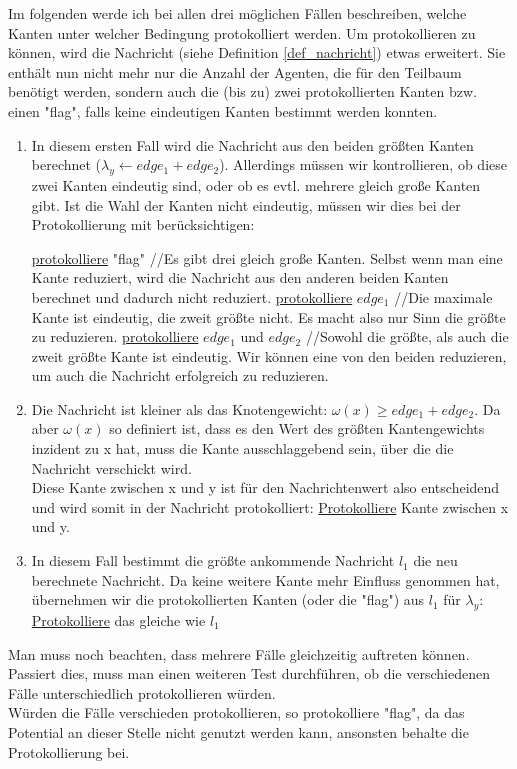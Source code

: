 Im folgenden werde ich bei allen drei möglichen Fällen beschreiben, welche Kanten unter welcher Bedingung protokolliert werden. Um protokollieren zu können, wird die Nachricht (siehe Definition \ref{def_nachricht}) etwas erweitert. Sie enthält nun nicht mehr nur die Anzahl der Agenten, die für den Teilbaum benötigt werden, sondern auch die (bis zu) zwei protokollierten Kanten bzw. einen "flag", falls keine eindeutigen Kanten bestimmt werden konnten.

\begin{enumerate}[label=\alph*)]
	
	\item In diesem ersten Fall wird die Nachricht aus den beiden größten Kanten berechnet ($\lambda_{y} \gets edge_{1} + edge_{2}$). Allerdings müssen wir kontrollieren, ob diese zwei Kanten eindeutig sind, oder ob es evtl. mehrere gleich große Kanten gibt. Ist die Wahl der Kanten nicht eindeutig, müssen wir dies bei der Protokollierung mit berücksichtigen:\\
	
		\begin{algorithmic}
			\State \uline{protokolliere} "flag"
			\State//Es gibt drei gleich große Kanten. Selbst wenn man eine Kante reduziert, wird die Nachricht aus den anderen beiden Kanten berechnet und dadurch nicht reduziert.
			\State \uline{protokolliere} $edge_{1}$
			\State//Die maximale Kante ist eindeutig, die zweit größte nicht. Es macht also nur Sinn die größte zu reduzieren.
			\Else
			\State \uline{protokolliere} $edge_{1}$ und $edge_{2}$
			\State//Sowohl die größte, als auch die zweit größte Kante ist eindeutig. Wir können eine von den beiden reduzieren, um auch die Nachricht erfolgreich zu reduzieren.
			\EndIf
		\end{algorithmic}
	
	\item Die Nachricht ist kleiner als das Knotengewicht: $\omega(x) \geq edge_{1}+edge_{2}$. Da aber $\omega(x)$ so definiert ist, dass es den Wert des größten Kantengewichts inzident zu x hat, muss die Kante ausschlaggebend sein, über die die Nachricht verschickt wird. 
	\\
	Diese Kante zwischen x und y ist für den Nachrichtenwert also entscheidend und wird somit in der Nachricht protokolliert: \uline{Protokolliere} Kante zwischen x und y.
	
	\item In diesem Fall bestimmt die größte ankommende Nachricht $l_{1}$ die neu berechnete Nachricht. Da keine weitere Kante mehr Einfluss genommen hat, übernehmen wir die protokollierten Kanten (oder die "flag") aus $l_{1}$ für $\lambda_{y}$: \uline{Protokolliere} das gleiche wie $l_{1}$
	
\end{enumerate}
Man muss noch beachten, dass mehrere Fälle gleichzeitig auftreten können. Passiert dies, muss man einen weiteren Test durchführen, ob die verschiedenen Fälle unterschiedlich protokollieren würden.
\\
Würden die Fälle verschieden protokollieren, so protokolliere "flag", da das Potential an dieser Stelle nicht genutzt werden kann, ansonsten behalte die Protokollierung bei.

